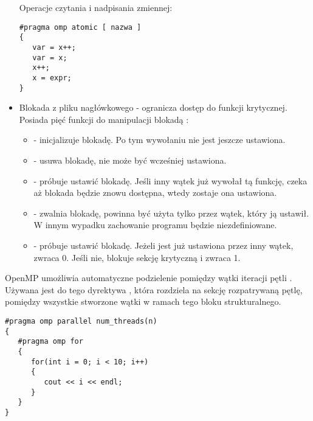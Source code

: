\documentclass[document.tex]{subfiles}
\begin{document}
\begin{itemize}
Operacje czytania i nadpisania zmiennej:
\begin{verbatim}
#pragma omp atomic [ nazwa ]
{
   var = x++;
   var = x; 
   x++;
   x = expr;
}
\end{verbatim}
\item Blokada  z pliku nagłówkowego  - ogranicza dostęp
do funkcji krytycznej. Posiada pięć funkcji do manipulacji blokadą \cite{openmp_guide}\cite{openmp_blaise}:
	\begin{itemize}
	\item {} - inicjalizuje blokadę. Po tym wywołaniu nie jest jeszcze ustawiona.
	\item {} - usuwa blokadę, nie może być wcześniej ustawiona.
	\item {} - próbuje ustawić blokadę. Jeśli inny wątek już wywołał tą
	funkcję, czeka aż blokada będzie znowu dostępna, wtedy zostaje ona ustawiona.
	\item {} - zwalnia blokadę, powinna być użyta tylko przez wątek,
	który ją ustawił. W innym wypadku zachowanie programu będzie niezdefiniowane.
	\item {} - próbuje ustawić blokadę. Jeżeli jest już ustawiona 
	przez inny wątek, zwraca 0. Jeśli nie, blokuje sekcję krytyczną i zwraca 1.
	\end{itemize}
\end{itemize}

\indent OpenMP umożliwia automatyczne podzielenie pomiędzy wątki iteracji pętli . 
Używana jest do tego dyrektywa , która rozdziela na sekcję rozpatrywaną pętlę, pomiędzy wszystkie stworzone wątki w ramach tego bloku strukturalnego.
\cite{openmp_guide}\cite{openmp_pacheco}
\begin{verbatim}
#pragma omp parallel num_threads(n)
{
   #pragma omp for
   {
      for(int i = 0; i < 10; i++)
      {
         cout << i << endl;
      }  
   }
}
\end{verbatim}
\end{document}

